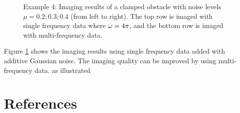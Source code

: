 \documentclass[12pt]{iopart}
\begin{document}
\begin{figure}
	\caption{Example 4: Imaging results of a clamped obstacle with noise levels $\mu =  0.2; 0.3; 0.4$ (from left to
		right). The top row is imaged with single frequency data where $\omega=4\pi$, and the
		bottom row is imaged with multi-frequency data.}\label{figure_4}
\end{figure}

Figure \ref{figure_4} shows the imaging results using single frequency data added with additive
Gaussian noise. The imaging quality can be improved by using multi-frequency data.
as illustrated 

\section*{References}

\end{document}
